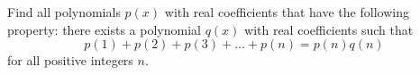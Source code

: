 Find all polynomials $p(x)$ with real coefficients that have the following property: there exists a polynomial $q(x)$ with real coefficients such that $$p(1) + p(2) + p(3) +\dots + p(n) = p(n)q(n)$$for all positive integers $n$.